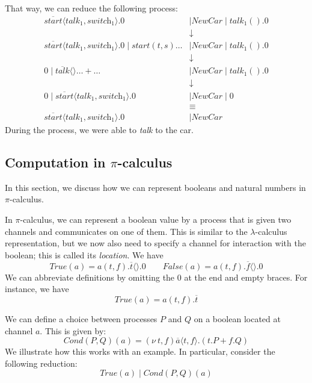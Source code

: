\documentclass[a4paper, openany]{memoir}
\theoremstyle{definition}
\begin{document}
    That way, we can reduce the following process:
    \begin{align*}
        \overline{\textit{start}} \langle \textit{talk}_1, \textit{switch}_1 \rangle.0 &\mid \textit{NewCar} \mid \textit{talk}_1().0 \\
        &\downarrow \\
        \overline{\textit{start}} \langle \textit{talk}_1, \textit{switch}_1 \rangle.0 \mid \textit{start}(t, s)\dots &\mid \textit{NewCar} \mid \textit{talk}_1().0 \\
        &\downarrow \\
        0 \mid \overline{\textit{talk}} \langle \rangle \dots + \dots &\mid \textit{NewCar} \mid \textit{talk}_1().0 \\
        &\downarrow \\
        0 \mid \overline{\textit{start}} \langle \textit{talk}_1, \textit{switch}_1 \rangle.0 &\mid \textit{NewCar} \mid 0 \\
        &\equiv \\
        \overline{\textit{start}} \langle \textit{talk}_1, \textit{switch}_1 \rangle.0 &\mid \textit{NewCar}
    \end{align*}
    During the process, we were able to \textit{talk} to the car.

    \subsection{Computation in $\pi$-calculus}
    In this section, we discuss how we can represent booleans and natural numbers in $\pi$-calculus.

    In $\pi$-calculus, we can represent a boolean value by a process that is given two channels and communicates on one of them. This is similar to the $\lambda$-calculus representation, but we now also need to specify a channel for interaction with the boolean; this is called its \emph{location}. We have
    \[\textit{True}(a) = a(t, f).\overline{t}\langle\rangle.0 \qquad \textit{False}(a) = a(t, f).\overline{f}\langle\rangle.0\]
    We can abbreviate definitions by omitting the $0$ at the end and empty braces. For instance, we have
    \[\textit{True}(a) = a(t, f).\overline{t}\]

    We can define a choice between processes $P$ and $Q$ on a boolean located at channel $a$. This is given by:
    \[\textit{Cond}(P, Q)(a) = (\nu \ t, f)\overline{a} \langle t, f \rangle.(t.P + f.Q)\]
    We illustrate how this works with an example. In particular, consider the following reduction:
    \[\textit{True}(a) \mid \textit{Cond}(P, Q)(a)\]
\end{document}
